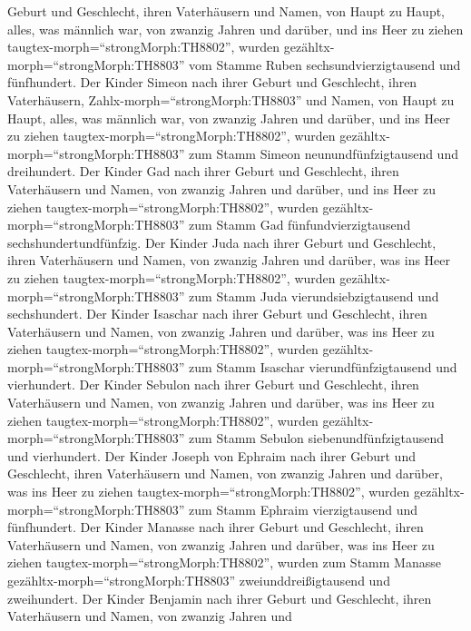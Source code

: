 Geburt und Geschlecht, ihren Vaterhäusern und Namen, von Haupt zu Haupt,
alles, was männlich war, von zwanzig Jahren und darüber, und ins Heer zu
ziehen taugtex-morph=``strongMorph:TH8802'',  wurden
gezähltx-morph=``strongMorph:TH8803'' vom Stamme Ruben
sechsundvierzigtausend und fünfhundert.  Der Kinder Simeon
nach ihrer Geburt und Geschlecht, ihren Vaterhäusern,
Zahlx-morph=``strongMorph:TH8803'' und Namen, von Haupt zu Haupt, alles,
was männlich war, von zwanzig Jahren und darüber, und ins Heer zu ziehen
taugtex-morph=``strongMorph:TH8802'',  wurden
gezähltx-morph=``strongMorph:TH8803'' zum Stamm Simeon
neunundfünfzigtausend und dreihundert.  Der Kinder Gad nach
ihrer Geburt und Geschlecht, ihren Vaterhäusern und Namen, von zwanzig
Jahren und darüber, und ins Heer zu ziehen
taugtex-morph=``strongMorph:TH8802'',  wurden
gezähltx-morph=``strongMorph:TH8803'' zum Stamm Gad
fünfundvierzigtausend sechshundertundfünfzig.  Der Kinder
Juda nach ihrer Geburt und Geschlecht, ihren Vaterhäusern und Namen, von
zwanzig Jahren und darüber, was ins Heer zu ziehen
taugtex-morph=``strongMorph:TH8802'',  wurden
gezähltx-morph=``strongMorph:TH8803'' zum Stamm Juda
vierundsiebzigtausend und sechshundert.  Der Kinder
Isaschar nach ihrer Geburt und Geschlecht, ihren Vaterhäusern und Namen,
von zwanzig Jahren und darüber, was ins Heer zu ziehen
taugtex-morph=``strongMorph:TH8802'',  wurden
gezähltx-morph=``strongMorph:TH8803'' zum Stamm Isaschar
vierundfünfzigtausend und vierhundert.  Der Kinder Sebulon
nach ihrer Geburt und Geschlecht, ihren Vaterhäusern und Namen, von
zwanzig Jahren und darüber, was ins Heer zu ziehen
taugtex-morph=``strongMorph:TH8802'',  wurden
gezähltx-morph=``strongMorph:TH8803'' zum Stamm Sebulon
siebenundfünfzigtausend und vierhundert.  Der Kinder Joseph
von Ephraim nach ihrer Geburt und Geschlecht, ihren Vaterhäusern und
Namen, von zwanzig Jahren und darüber, was ins Heer zu ziehen
taugtex-morph=``strongMorph:TH8802'',  wurden
gezähltx-morph=``strongMorph:TH8803'' zum Stamm Ephraim vierzigtausend
und fünfhundert.  Der Kinder Manasse nach ihrer Geburt und
Geschlecht, ihren Vaterhäusern und Namen, von zwanzig Jahren und
darüber, was ins Heer zu ziehen taugtex-morph=``strongMorph:TH8802'',
 wurden zum Stamm Manasse
gezähltx-morph=``strongMorph:TH8803'' zweiunddreißigtausend und
zweihundert.  Der Kinder Benjamin nach ihrer Geburt und
Geschlecht, ihren Vaterhäusern und Namen, von zwanzig Jahren und
